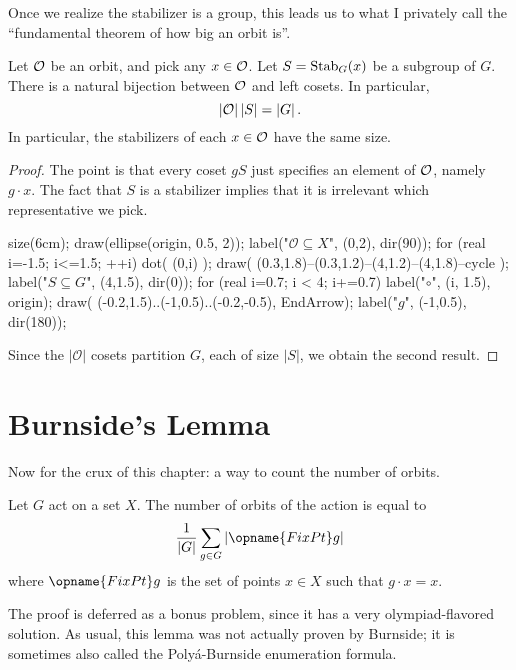 Once we realize the stabilizer is a group, this leads us to what I privately call the ``fundamental theorem of how big an orbit is''.
\begin{theorem}
	Let $\mathcal O$ be an orbit, and pick any $x \in \mathcal O$.
	Let $S = \operatorname{Stab}_G(x)$ be a subgroup of $G$.
	There is a natural bijection between $\mathcal O$ and left cosets.
	In particular,
	\[ \left\lvert \mathcal O \right\rvert \left\lvert S \right\rvert = \left\lvert G \right\rvert. \]
	In particular, the stabilizers of each $x \in \mathcal O$ have the same size.
\end{theorem}
\begin{proof}
	The point is that every coset $gS$ just specifies an element of $\mathcal O$,
	namely $g \cdot x$. The fact that $S$ is a stabilizer implies
	that it is irrelevant which representative we pick.

	\begin{center}
		\begin{asy}
			size(6cm);
			draw(ellipse(origin, 0.5, 2));
			label("$\mathcal O \subseteq X$", (0,2), dir(90));
			for (real i=-1.5; i<=1.5; ++i) {
				dot( (0,i) );
			}
			draw( (0.3,1.8)--(0.3,1.2)--(4,1.2)--(4,1.8)--cycle );
			label("$S \subseteq G$", (4,1.5), dir(0));
			for (real i=0.7; i < 4; i+=0.7) {
				label("$\circ$", (i, 1.5), origin);
			}
			draw( (-0.2,1.5)..(-1,0.5)..(-0.2,-0.5), EndArrow);
			label("$g$", (-1,0.5), dir(180));
		\end{asy}
	\end{center}

	Since the $\left\lvert \mathcal O \right\rvert$ cosets partition $G$,
	each of size $\left\lvert S \right\rvert$, we obtain the second result.
\end{proof}

\section{Burnside's Lemma}
Now for the crux of this chapter: a way to count the number of orbits.
\begin{theorem}
	Let $G$ act on a set $X$.
	The number of orbits of the action is equal to
	\[ \frac{1}{\left\lvert G \right\rvert}
		\sum_{g \in G} \left\lvert \opname{FixPt} g \right\rvert \]
	where $\opname{FixPt} g$ is the set of points $x \in X$
	such that $g \cdot x = x$.
\end{theorem}
The proof is deferred as a bonus problem, since it has a very olympiad-flavored solution.
As usual, this lemma was not actually proven by Burnside;
it is sometimes also called the Poly\'a-Burnside enumeration formula.

